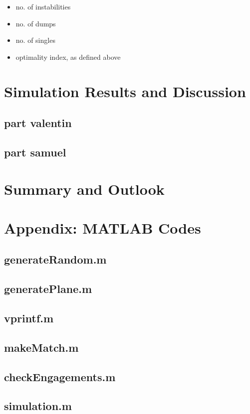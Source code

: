 \documentclass[11pt]{article}
\begin{document}
\begin{itemize}
  \item no. of instabilities
  \item no. of dumps
  \item no. of singles
  \item optimality index, as defined above
\end{itemize}

\section{Simulation Results and Discussion}

\subsection{part valentin}

\subsection{part samuel}

\section{Summary and Outlook}

\renewcommand{\refname}{\section{References}}





\section{Appendix: MATLAB Codes}

\subsection*{generateRandom.m}

\subsection*{generatePlane.m}

\subsection*{vprintf.m}

\subsection*{makeMatch.m}

\subsection*{checkEngagements.m}

\subsection*{simulation.m}

\end{document}
